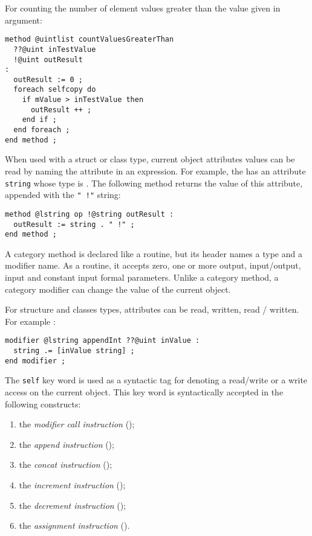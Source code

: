 For counting the number of element values greater than the value given in argument:
\begin{lstlisting}[language=galgas]
method @uintlist countValuesGreaterThan
  ??@uint inTestValue
  !@uint outResult
:
  outResult := 0 ;
  foreach selfcopy do
    if mValue > inTestValue then
      outResult ++ ;
    end if ;
  end foreach ;
end method ;
\end{lstlisting}

When used with a struct or class type, current object attributes values can be read by naming the attribute in an expression. For example, the  has an attribute 
\lstinline[language=galgas]!string! whose type is . The following method returns the value of this attribute, appended with the \lstinline[language=galgas]?" !"? string:
\begin{lstlisting}[language=galgas]
method @lstring op !@string outResult :
  outResult := string . " !" ;
end method ;
\end{lstlisting}












A category method is declared like a routine, but its header names a type and a modifier name. As a routine, it accepts zero, one or more output, input/output, input and constant input formal parameters. Unlike a category method, a category modifier can change the value of the current object.

For structure and classes types, attributes can be read, written, read / written. For example :
\begin{lstlisting}[language=galgas]
modifier @lstring appendInt ??@uint inValue :
  string .= [inValue string] ;
end modifier ;
\end{lstlisting}


The \lstinline[language=galgas]!self! key word is used as a syntactic tag for denoting a read/write or a write access on the current object. This key word is syntactically accepted in the following constructs:
\begin{enumerate}
\item the \emph{modifier call instruction} ();
\item the \emph{append instruction} ();
\item the \emph{concat instruction} ();
\item the \emph{increment instruction} ();
\item the \emph{decrement instruction} ();
\item the \emph{assignment instruction} ().
\end{enumerate}

